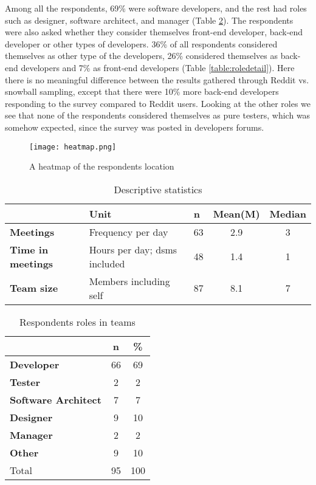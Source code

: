 Among all the respondents, 69\% were software developers, and the rest had roles such as designer, software architect, and manager (Table \ref{table:roles}). The respondents were also asked whether they consider themselves front-end developer, back-end developer or other types of developers. 36\% of all respondents considered themselves as other type of the developers, 26\% considered themselves as back-end developers and 7\% as front-end developers (Table \ref{table:roledetail}). Here there is no meaningful difference between the results gathered through Reddit vs. snowball sampling, except that there were 10\% more back-end developers responding to the survey compared to Reddit users. Looking at the other roles we see that none of the respondents considered themselves as pure testers, which was somehow expected, since the survey was posted in developers forums. 

\begin{figure}[hbt!]
\centering
\texttt{[image: heatmap.png]}
\caption{A heatmap of the respondents location}\label{fig:heatmap}
\end{figure}


\begin{table}
\centering
\caption{Descriptive statistics} \label{table:ds}
\begin{tabular}{lllcc}
\hline
 & \textbf{Unit} & \textbf{n} & \textbf{Mean(M)} & \textbf{Median} \\ \hline
\textbf{Meetings} & Frequency per day & 63 & 2.9 & 3 \\
\textbf{Time in meetings} & Hours per day; \ac{dsm}s included & 48 & 1.4 & 1 \\
\textbf{Team size} & Members including self & 87 & 8.1 & 7 \\
\hline
\end{tabular}
\end{table}



\begin{table}
\centering
\caption{Respondents roles in teams} \label{table:roles}
\begin{tabular}{lcc}
\hline
 & \textbf{n} & \textbf{\%} \\ \hline
\textbf{Developer}&66&69\\
\textbf{Tester}&2&2\\
\textbf{Software Architect}&7&7\\
\textbf{Designer}&9&10\\
\textbf{Manager}&2&2\\
\textbf{Other}&9&10\\
Total&95&100\\
\hline
\end{tabular}
\end{table}


